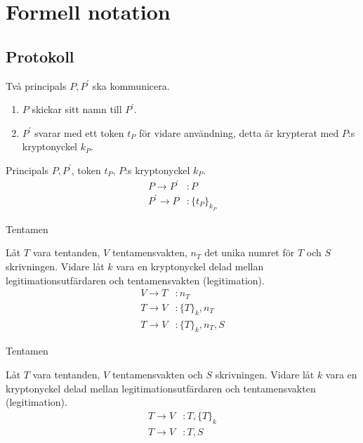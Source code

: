 \documentclass{beamer}
\theoremstyle{definition}
\theoremstyle{remark}
\begin{document}
\section{Formell notation}

\subsection{Protokoll}

\begin{frame}{\insertsubsectionhead}
  \begin{example}[Protokollbeskrivning]
    Två principals \(P, P^\prime\) ska kommunicera.
    \begin{enumerate}
      \item \(P\) skickar sitt namn till \(P^\prime\).
      \item \(P^\prime\) svarar med ett token \(t_P\) för vidare användning, 
        detta är krypterat med \(P\):s kryptonyckel \(k_P\).
    \end{enumerate}
  \end{example}
  \begin{example}
    Principals \(P, P^\prime\), token \(t_P\), \(P\):s kryptonyckel \(k_P\).
    \begin{align*}
      P\to P^\prime&\colon P \\
      P^\prime\to P&\colon \{t_P\}_{k_P}
    \end{align*}
  \end{example}
\end{frame}

\begin{frame}{\insertsubsectionhead}{Tentamen}
  \begin{example}
    Låt \(T\) vara tentanden, \(V\) tentamensvakten, \(n_T\) det unika numret 
    för \(T\) och \(S\) skrivningen.
    Vidare låt \(k\) vara en kryptonyckel delad mellan legitimationsutfärdaren 
    och tentamensvakten (legitimation).
    \begin{align*}
      V\to T&\colon n_T \\
      T\to V&\colon \{T\}_k, n_T \\
      T\to V&\colon \{T\}_k, n_T, S
    \end{align*}
  \end{example}
\end{frame}

\begin{frame}{\insertsubsectionhead}{Tentamen}
  \begin{example}
    Låt \(T\) vara tentanden, \(V\) tentamensvakten och \(S\) skrivningen.
    Vidare låt \(k\) vara en kryptonyckel delad mellan legitimationsutfärdaren 
    och tentamensvakten (legitimation).
    \begin{align*}
      T\to V&\colon T, \{T\}_k \\
      T\to V&\colon T, S
    \end{align*}
  \end{example}
\end{frame}
\end{document}
